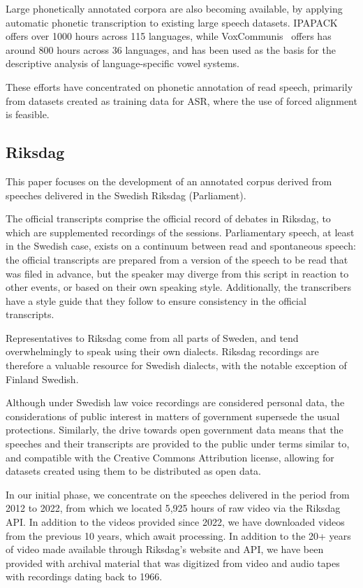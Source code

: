 \documentclass{Interspeech}
\begin{document}
Large phonetically annotated corpora are also becoming available, by applying automatic phonetic transcription to existing large speech datasets. IPAPACK~\cite{zhu-etal-2024-taste} offers over 1000 hours across 115 languages, while VoxCommunis~\cite{ahn-chodroff-2022-voxcommunis} offers has around 800 hours across 36 languages, and has been used as the basis for the descriptive analysis of language-specific vowel systems.

These efforts have concentrated on phonetic annotation of read speech, primarily from datasets created as training data for ASR, where the use of forced alignment is feasible.


\subsection{Riksdag}

This paper focuses on the development of an annotated corpus derived from speeches delivered in the Swedish Riksdag (Parliament).

The official transcripts comprise the official record of debates in Riksdag, to which are supplemented recordings of the sessions.
Parliamentary speech, at least in the Swedish case, exists on a continuum between read and spontaneous speech: the official transcripts are prepared from a version of the speech to be read that was filed in advance, but the speaker may diverge from this script in reaction to other events, or based on their own speaking style. Additionally, the transcribers have a style guide that they follow to ensure consistency in the official transcripts.

Representatives to Riksdag come from all parts of Sweden, and tend overwhelmingly to speak using their own dialects. Riksdag recordings are therefore a valuable resource for Swedish dialects, with the notable exception of Finland Swedish.

Although under Swedish law voice recordings are considered personal data, the considerations of public interest in matters of government supersede the usual protections. Similarly, the drive towards open government data means that the speeches and their transcripts are provided to the public under terms similar to, and compatible with the Creative Commons Attribution license, allowing for datasets created using them to be distributed as open data.

In our initial phase, we concentrate on the speeches delivered in the period from 2012 to 2022, from which we located 5,925 hours of raw video via the Riksdag API. In addition to the videos provided since 2022, we have downloaded videos from the previous 10 years, which await processing. In addition to the 20+ years of video made available through Riksdag's website and API, we have been provided with archival material that was digitized from video and audio tapes with recordings dating back to 1966.
\end{document}

